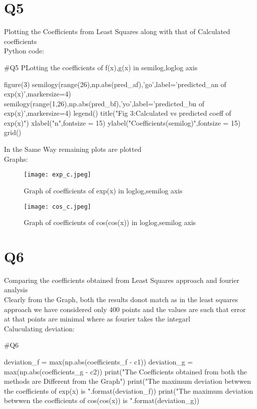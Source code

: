 \documentclass[12pt, a4paper]{report}
\begin{document}
\section*{Q5}
Plotting the Coefficients from Least Squares along with that of Calculated coefficients\\
Python code:
{\tiny
\begin{py_code}

#Q5 PLotting the coefficients of f(x),g(x) in semilog,loglog axis        

figure(3)
semilogy(range(26),np.abs(pred_af),'go',label='predicted_an of exp(x)',markersize=4)
semilogy(range(1,26),np.abs(pred_bf),'yo',label='predicted_bn of exp(x)',markersize=4)
legend()
title("Fig 3:Calculated vs predicted coeff of exp(x)")
xlabel("n",fontsize = 15)
ylabel("Coefficients(semilog)",fontsize = 15)
grid()


\end{py_code}
}
In the Same Way remaining plots are plotted \\
Graphs:
 \begin{figure}[H]
	\centering
	\texttt{[image: exp\_c.jpeg]}  %
	\caption{Graph of coefficients of exp(x) in loglog,semilog axis}
	\label{fig:Q4 }
\end{figure} 
\begin{figure}[H]
	\centering
	\texttt{[image: cos\_c.jpeg]}  %
	\caption{Graph of coefficients of cos(cos(x)) in loglog,semilog axis}
	\label{fig:Q4 }
\end{figure} 
\section*{Q6}
Comparing the coefficients obtained from Least Squares approach and fourier analysis\\
Clearly from the Graph, both the results donot match as in the least squares approach we have considered only 400 points and the values are such that error at that points are minimal where as fourier takes the integarl \\
Caluculating deviation:\\
\begin{py_code}
#Q6 

deviation_f = max(np.abs(coefficients_f - c1)) 
deviation_g = max(np.abs(coefficients_g - c2))
print("The Coefficients obtained from both the methods are Different from the Graph")
print("The maximum deviation betwwen the coefficients of exp(x) is {}".format(deviation_f))
print("The maximum deviation betwwen the coefficients of cos(cos(x)) is {}".format(deviation_g))
\end{py_code}
\end{document}
